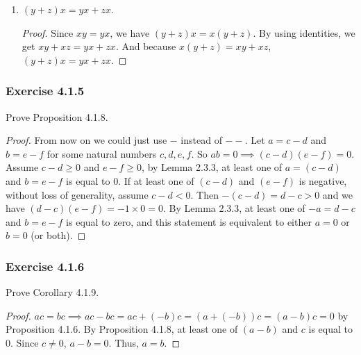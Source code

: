 \documentclass[12pt, letter]{article}
\begin{document}
\begin{enumerate}
\begin{proof}
\begin{equation*}
\begin{aligned}
                &=(ac+ae+bd+bf)\mathtt{--}(ae+af+bc+bd);\\
                xy+xz&=(a\mathtt{--}b)(c\mathtt{--}d)+(a\mathtt{--}b)(e\mathtt{--}f)\\
                &=((ac+bd)\mathtt{--}(ad+bc))+((ae+bf)\mathtt{--}(af+be))\\
                &=((ac+bd)+(ae+bf))\mathtt{--}((ad+bc)+(af+be))\\
                &=(ac+ae+bd+bf)\mathtt{--}(ae+af+bc+bd).
            \end{aligned}
        \end{equation*}
        Therefore, $x(y+z)=xy+xz$.
    \end{proof}
    \item $(y+z)x=yx+zx$.
    \begin{proof}
        Since $xy=yx$, we have $(y+z)x=x(y+z)$. By using identities, we get $xy+xz=yx+zx$. And because $x(y+z)=xy+xz$, $(y+z)x=yx+zx$.
    \end{proof}
\end{enumerate}
\subsubsection*{Exercise 4.1.5}
Prove Proposition 4.1.8.
\begin{proof}
    From now on we could just use $-$ instead of $\mathtt{--}$. Let $a=c-d$ and $b=e-f$ for some natural numbers $c,d,e,f$. So $ab=0\implies (c-d)(e-f)=0$.
    Assume $c-d\geq 0$ and $e-f\geq 0$, by Lemma 2.3.3, at least one of $a=(c-d)$ and $b=e-f$ is equal to 0. If at least one of $(c-d)$ and $(e-f)$ 
    is negative, without loss of generality, assume $c-d<0$. Then $-(c-d)=d-c>0$ and we have $(d-c)(e-f)=-1\times 0=0$. By Lemma 2.3.3, 
    at least one of $-a=d-c$ and $b=e-f$ is equal to zero, and this statement is equivalent to either $a=0$ or $b=0$ (or both). 
\end{proof}
\subsubsection*{Exercise 4.1.6}
Prove Corollary 4.1.9.
\begin{proof}
    $ac=bc\implies ac-bc=ac+(-b)c=(a+(-b))c=(a-b)c=0$ by Proposition 4.1.6. By Proposition 4.1.8, at least one of $(a-b)$ and $c$ is equal to 0. Since 
    $c\ne 0$, $a-b=0$. Thus, $a=b$.
\end{proof}
\end{document}
